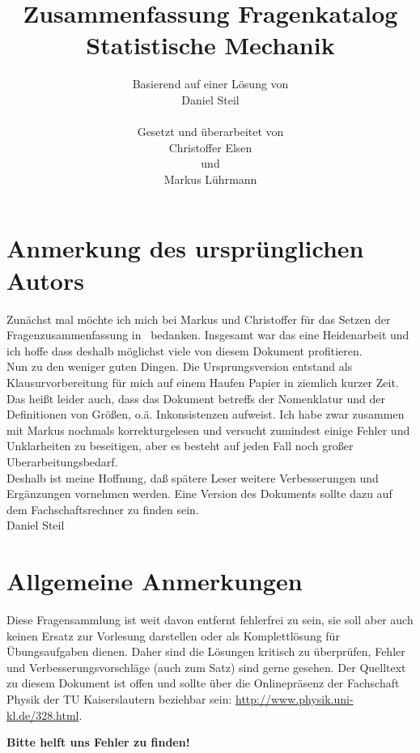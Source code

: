 \documentclass[a4paper,12pt]{scrartcl}
\author{Basierend auf einer Lösung von\\Daniel Steil\\\\Gesetzt und überarbeitet von\\Christoffer Elsen\\und\\ Markus 
Lührmann\\}
\title{Zusammenfassung Fragenkatalog\\Statistische Mechanik}
\begin{document}
\maketitle
\newpage

\section*{Anmerkung des ursprünglichen Autors}
Zunächst mal möchte ich mich bei Markus und Christoffer für das Setzen der Fragenzusammenfassung in \LaTeXe \ bedanken. Insgesamt war das eine Heidenarbeit und ich hoffe dass deshalb möglichst viele von diesem Dokument profitieren.\\
Nun zu den weniger guten Dingen. Die Ursprungsversion entstand als Klausurvorbereitung für mich auf einem Haufen Papier in ziemlich kurzer Zeit. Das heißt leider auch, dass das Dokument betreffs der Nomenklatur und der Definitionen von Größen, o.ä. Inkonsistenzen aufweist. Ich habe zwar zusammen mit Markus nochmals korrekturgelesen und versucht zumindest einige Fehler und Unklarheiten zu beseitigen, aber es besteht auf jeden Fall noch großer Uberarbeitungsbedarf.\\
Deshalb ist meine Hoffnung, daß spätere Leser weitere Verbesserungen und Ergänzungen vornehmen werden. Eine Version des Dokuments sollte dazu auf dem Fachschaftsrechner zu finden sein.\\

Daniel Steil\\

\section*{Allgemeine Anmerkungen}
Diese Fragensammlung ist weit davon entfernt fehlerfrei zu sein, sie soll aber auch keinen Ersatz zur Vorlesung darstellen oder als Komplettlösung für Übungsaufgaben dienen. Daher sind die Lösungen kritisch zu überprüfen, Fehler und Verbesserungsvorschläge (auch zum Satz) sind gerne gesehen. Der Quelltext zu diesem Dokument ist offen und sollte über die Onlinepräsenz der Fachschaft Physik der TU Kaiserslautern beziehbar sein: \url{http://www.physik.uni-kl.de/328.html}.
\par
\begin{center} \textbf{Bitte helft uns Fehler zu finden!} \end{center}
\newpage

\end{document}
